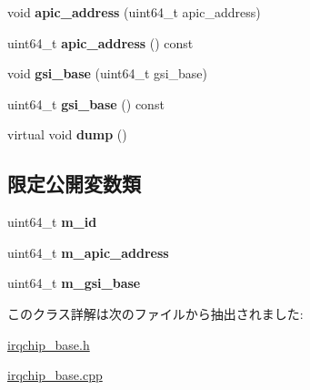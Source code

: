 \begin{DoxyCompactItemize}
\item 
\hypertarget{classirqchip__base_a34f72690465fc4c6bd43acdb5d899cb9}{}void {\bfseries apic\+\_\+address} (uint64\+\_\+t apic\+\_\+address)\label{classirqchip__base_a34f72690465fc4c6bd43acdb5d899cb9}

\item 
\hypertarget{classirqchip__base_a0824428ab8367abd49432da27ae6fa2e}{}uint64\+\_\+t {\bfseries apic\+\_\+address} () const \label{classirqchip__base_a0824428ab8367abd49432da27ae6fa2e}

\item 
\hypertarget{classirqchip__base_a1984063ac11bd29816cc7a76039b37cc}{}void {\bfseries gsi\+\_\+base} (uint64\+\_\+t gsi\+\_\+base)\label{classirqchip__base_a1984063ac11bd29816cc7a76039b37cc}

\item 
\hypertarget{classirqchip__base_ab22239fa08a58c083872f5248ccc377a}{}uint64\+\_\+t {\bfseries gsi\+\_\+base} () const \label{classirqchip__base_ab22239fa08a58c083872f5248ccc377a}

\item 
\hypertarget{classirqchip__base_a544e712c7734cbed1f518b522e995940}{}virtual void {\bfseries dump} ()\label{classirqchip__base_a544e712c7734cbed1f518b522e995940}

\end{DoxyCompactItemize}
\subsection*{限定公開変数類}
\begin{DoxyCompactItemize}
\item 
\hypertarget{classirqchip__base_ae7255e86f77a25d9f726e453c6d7b5d9}{}uint64\+\_\+t {\bfseries m\+\_\+id}\label{classirqchip__base_ae7255e86f77a25d9f726e453c6d7b5d9}

\item 
\hypertarget{classirqchip__base_a5339ea4fc664a0d9f2d097ad898501da}{}uint64\+\_\+t {\bfseries m\+\_\+apic\+\_\+address}\label{classirqchip__base_a5339ea4fc664a0d9f2d097ad898501da}

\item 
\hypertarget{classirqchip__base_a31e091987d979c393448c2395d762831}{}uint64\+\_\+t {\bfseries m\+\_\+gsi\+\_\+base}\label{classirqchip__base_a31e091987d979c393448c2395d762831}

\end{DoxyCompactItemize}


このクラス詳解は次のファイルから抽出されました\+:\begin{DoxyCompactItemize}
\item 
\hyperlink{irqchip__base_8h}{irqchip\+\_\+base.\+h}\item 
\hyperlink{irqchip__base_8cpp}{irqchip\+\_\+base.\+cpp}\end{DoxyCompactItemize}
